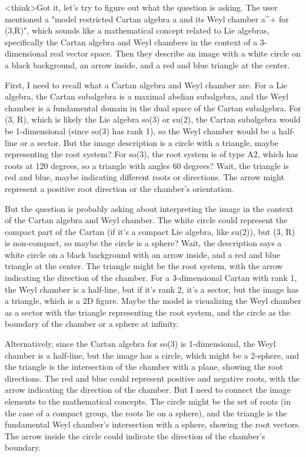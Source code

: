 <think>Got it, let's try to figure out what the question is asking. The user mentioned a "model restricted Cartan algebra a and its Weyl chamber a^+ for (3,R)", which sounds like a mathematical concept related to Lie algebras, specifically the Cartan algebra and Weyl chambers in the context of a 3-dimensional real vector space. Then they describe an image with a white circle on a black background, an arrow inside, and a red and blue triangle at the center. 

First, I need to recall what a Cartan algebra and Weyl chamber are. For a Lie algebra, the Cartan subalgebra is a maximal abelian subalgebra, and the Weyl chamber is a fundamental domain in the dual space of the Cartan subalgebra. For (3, R), which is likely the Lie algebra so(3) or su(2), the Cartan subalgebra would be 1-dimensional (since so(3) has rank 1), so the Weyl chamber would be a half-line or a sector. But the image description is a circle with a triangle, maybe representing the root system? For so(3), the root system is of type A2, which has roots at 120 degrees, so a triangle with angles 60 degrees? Wait, the triangle is red and blue, maybe indicating different roots or directions. The arrow might represent a positive root direction or the chamber's orientation.

But the question is probably asking about interpreting the image in the context of the Cartan algebra and Weyl chamber. The white circle could represent the compact part of the Cartan (if it's a compact Lie algebra, like su(2)), but (3, R) is non-compact, so maybe the circle is a sphere? Wait, the description says a white circle on a black background with an arrow inside, and a red and blue triangle at the center. The triangle might be the root system, with the arrow indicating the direction of the chamber. For a 3-dimensional Cartan with rank 1, the Weyl chamber is a half-line, but if it's rank 2, it's a sector, but the image has a triangle, which is a 2D figure. Maybe the model is visualizing the Weyl chamber as a sector with the triangle representing the root system, and the circle as the boundary of the chamber or a sphere at infinity.

Alternatively, since the Cartan algebra for so(3) is 1-dimensional, the Weyl chamber is a half-line, but the image has a circle, which might be a 2-sphere, and the triangle is the intersection of the chamber with a plane, showing the root directions. The red and blue could represent positive and negative roots, with the arrow indicating the direction of the chamber. But I need to connect the image elements to the mathematical concepts. The circle might be the set of roots (in the case of a compact group, the roots lie on a sphere), and the triangle is the fundamental Weyl chamber's intersection with a sphere, showing the root vectors. The arrow inside the circle could indicate the direction of the chamber's boundary.

